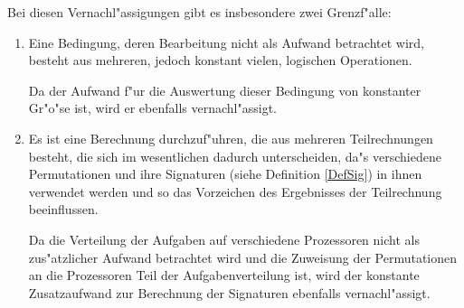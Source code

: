 Bei diesen 
Vernachl"assigungen gibt es insbesondere zwei Grenzf"alle:
\begin{enumerate}
\item 
     Eine Bedingung, deren Bearbeitung nicht als Aufwand betrachtet wird, 
     besteht aus mehreren, jedoch konstant vielen, logischen Operationen.
     
     Da der Aufwand f"ur die Auswertung dieser Bedingung von konstanter
     Gr"o"se ist, wird er ebenfalls vernachl"assigt.
\item
     Es ist eine Berechnung durchzuf"uhren, die aus mehreren Teilrechnungen
     besteht, die sich im wesentlichen dadurch unterscheiden, da"s 
     verschiedene Permutationen und ihre Signaturen (siehe Definition
     \ref{DefSig}) in ihnen verwendet werden und so das Vorzeichen 
     des Ergebnisses der Teilrechnung beeinflussen. 
     
     Da die Verteilung der Aufgaben auf verschiedene Prozessoren nicht als
     zus"atzlicher Aufwand betrachtet wird und die Zuweisung der 
     Permutationen an die Prozessoren Teil der Aufgabenverteilung ist, wird
     der konstante Zusatzaufwand zur Berechnung der Signaturen ebenfalls
     vernachl"assigt.
\end{enumerate}

